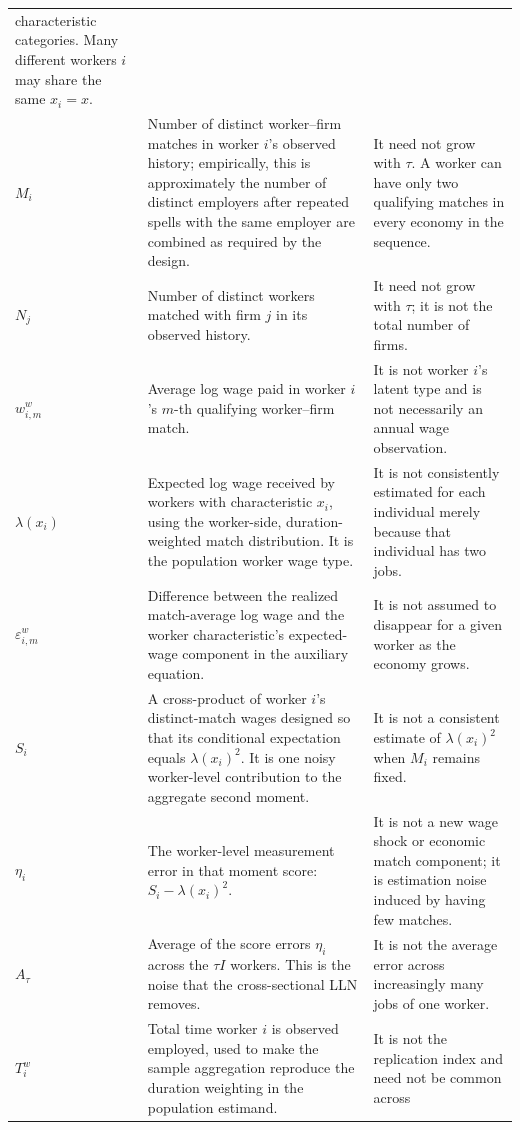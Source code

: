 \documentclass[11pt]{article}
\begin{document}
\begin{longtable}{p{}p{}p{}}
characteristic categories.  Many different workers \(i\) may share the same
\(x_i=x\). \\
\(M_i\) & Number of distinct worker--firm matches in worker \(i\)'s observed
history; empirically, this is approximately the number of distinct employers
after repeated spells with the same employer are combined as required by the
design. & It need not grow with \(\tau\).  A worker can have only two
qualifying matches in every economy in the sequence. \\
\(N_j\) & Number of distinct workers matched with firm \(j\) in its observed
history. & It need not grow with \(\tau\); it is not the total number of
firms. \\
\(w^w_{i,m}\) & Average log wage paid in worker \(i\)'s \(m\)-th qualifying
worker--firm match. & It is not worker \(i\)'s latent type and is not
necessarily an annual wage observation. \\
\(\lambda(x_i)\) & Expected log wage received by workers with characteristic
\(x_i\), using the worker-side, duration-weighted match distribution.  It is
the population worker wage type. & It is not consistently estimated for
each individual merely because that individual has two jobs. \\
\(\varepsilon^w_{i,m}\) & Difference between the realized match-average log
wage and the worker characteristic's expected-wage component in the
auxiliary equation. & It is not assumed to disappear for a given worker as
the economy grows. \\
\(S_i\) & A cross-product of worker \(i\)'s distinct-match wages designed so
that its conditional expectation equals \(\lambda(x_i)^2\).  It is one
noisy worker-level contribution to the aggregate second moment. & It is not
a consistent estimate of \(\lambda(x_i)^2\) when \(M_i\) remains fixed. \\
\(\eta_i\) & The worker-level measurement error in that moment score:
\(S_i-\lambda(x_i)^2\). & It is not a new wage shock or economic match
component; it is estimation noise induced by having few matches. \\
\(A_\tau\) & Average of the score errors \(\eta_i\) across the
\(\tau I\) workers.  This is the noise that the cross-sectional LLN removes.
& It is not the average error across increasingly many jobs of one worker. \\
\(T_i^w\) & Total time worker \(i\) is observed employed, used to make the
sample aggregation reproduce the duration weighting in the population
estimand. & It is not the replication index and need not be common across

\end{longtable}
\end{document}
